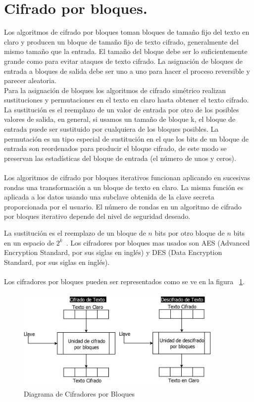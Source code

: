 \section{Cifrado por bloques. }
Los algoritmos de cifrado por bloques toman bloques de tamaño fijo del texto en claro y producen un bloque de tamaño fijo de texto cifrado, generalmente del mismo tamaño que la entrada. El tamaño del bloque debe ser lo suficientemente grande como para evitar ataques de texto cifrado. La asignación de bloques de entrada a bloques de salida debe ser uno a uno para hacer el proceso reversible y parecer aleatoria.\\ 
Para la asignación de bloques los algoritmos de cifrado simétrico realizan sustituciones y permutaciones en el texto en claro hasta obtener el texto cifrado.\\ 
La sustitución es el reemplazo de un valor de entrada por otro de los posibles valores de salida, en general, si usamos un tamaño de bloque k, el bloque de entrada puede ser sustituido por cualquiera de los bloques posibles.
La permutación es un tipo especial de sustitución en el que los bits de un bloque de entrada son reordenados para producir el bloque cifrado, de este modo se preservan las estadísticas del bloque de entrada (el número de unos y ceros). \\ \\  Los algoritmos de cifrado por bloques iterativos funcionan aplicando en sucesivas rondas una transformación a un bloque de texto en claro. La misma función es aplicada a los datos usando una subclave obtenida de la clave secreta proporcionada por el usuario. El número de rondas en un algoritmo de cifrado por bloques iterativo depende del nivel de seguridad deseado.

La sustitución es el reemplazo de un bloque de $n$ bits por otro bloque de $n$ bits en un espacio de 
$2^{k}$~\cite{bloc}. Los cifradores por bloques mas usados son AES (Advanced Encryption Standard, por sus 
siglas en ingl\'es) y DES (Data Encryption Standard, por sus siglas en ingl\'es). ~\cite{bloques}\\ \\ 

Los cifradores por bloques pueden ser representados como se ve en la figura ~\ref{fig:1-2-5}.

\begin{figure}[H]
\centering
	\includegraphics[width=10cm, height=5cm]{./images/CifradoBloques.jpeg}
	\caption{Diagrama de Cifradores por Bloques}
	\label{fig:1-2-5}
\end{figure}



